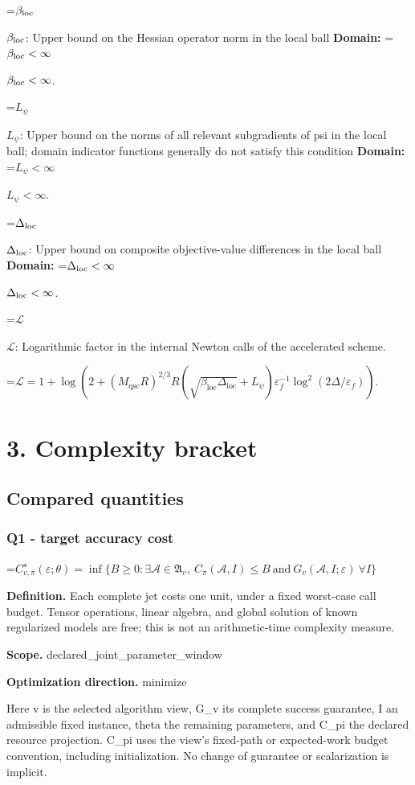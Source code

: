 \documentclass[10pt,a4paper]{article}
\newcommand{\AtlasMath}[1]{\par\begingroup\centering\setbox0=\hbox{$\displaystyle #1$}\ifdim\wd0>1.4\linewidth\typeout{ATLAS WIDE FORMULA: \the\wd0}\fi\ifdim\wd0>\linewidth\resizebox{\linewidth}{!}{\box0}\else\box0\fi\par\endgroup}
\newcommand{\AtlasInlineMath}[1]{\begingroup\setbox0=\hbox{$#1$}\ifdim\wd0>.4\linewidth\endgroup\AtlasMath{#1}\else\endgroup$#1$\fi}
\begin{document}
\AtlasInlineMath{\beta_{\rm loc}}: Upper bound on the Hessian operator norm in the local ball \textbf{Domain:} \AtlasInlineMath{\beta_{\rm loc}<\infty}.

\AtlasInlineMath{L_\psi}: Upper bound on the norms of all relevant subgradients of psi in the local ball; domain indicator functions generally do not satisfy this condition \textbf{Domain:} \AtlasInlineMath{L_\psi<\infty}.

\AtlasInlineMath{\Delta_{\rm loc}}: Upper bound on composite objective-value differences in the local ball \textbf{Domain:} \AtlasInlineMath{\Delta_{\rm loc}<\infty}.

\AtlasInlineMath{\mathcal{L}}: Logarithmic factor in the internal Newton calls of the accelerated scheme.


\AtlasMath{\mathcal{L}=1+\log\!\left(2+(M_{\mathrm{qsc}}R)^{2/3}R(\sqrt{\beta_{\mathrm{loc}}\Delta_{\mathrm{loc}}}+L_\psi)\varepsilon_f^{-1}\log^2(2\Delta/\varepsilon_f)\right).}


\section{3. Complexity bracket}
\subsection{Compared quantities}
\subsubsection{Q1 - target accuracy cost}
\AtlasMath{C^\star_{v,\pi}(\varepsilon;\theta)=\inf\{B\ge0:\exists\mathcal A\in\mathfrak A_v,\ C_\pi(\mathcal A,I)\le B\ \text{and}\ G_v(\mathcal A,I;\varepsilon)\ \forall I\}}
\textbf{Definition.} Each complete jet costs one unit, under a fixed worst-case call budget. Tensor operations, linear algebra, and global solution of known regularized models are free; this is not an arithmetic-time complexity measure.

\textbf{Scope.} declared\_joint\_parameter\_window

\textbf{Optimization direction.} minimize

Here v is the selected algorithm view, G\_v its complete success guarantee, I an admissible fixed instance, theta the remaining parameters, and C\_pi the declared resource projection. C\_pi uses the view's fixed-path or expected-work budget convention, including initialization. No change of guarantee or scalarization is implicit.
\end{document}
